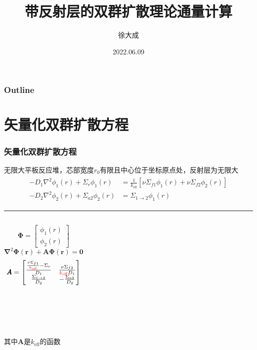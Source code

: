 \documentclass[handout,10pt]{beamer}
\title[Multigroup Diffusion Equations]{带反射层的双群扩散理论通量计算}
\author[Dacheng Xu]{徐大成}
\institute[DEP]{清华大学工程物理系}
\date{2022.06.09}
\begin{document}
\frame{\titlepage}

\begin{frame}[noframenumbering]
\frametitle{Outline}
\thispagestyle{empty}
\tableofcontents
\end{frame}

\section{矢量化双群扩散方程}

\begin{frame}
\frametitle{矢量化双群扩散方程}
无限大平板反应堆，芯部宽度$r_0$有限且中心位于坐标原点处，反射层为无限大
\begin{align*}
    \label{eq:two3_group}
    \begin{split}
        -D_1\nabla^2\phi_1(r) + \Sigma_r\phi_1(r) &= \frac{1}{k_\mathrm{eff}}\left[\nu\Sigma_{f1}\phi_1(r)+\nu\Sigma_{f2}\phi_2(r)\right] \\
        -D_2\nabla^2\phi_2(r) + \Sigma_{a2}\phi_2(r) &= \Sigma_{1\rightarrow 2}\phi_1(r)
    \end{split}
\end{align*}
\noindent\rule{\textwidth}{0.5pt}
\begin{columns}
\begin{equation*}
    \label{eq:vector_phi}
    \pmb{\Phi} = \begin{bmatrix}
        \phi_1(r) \\
        \phi_2(r)
    \end{bmatrix}
\end{equation*}
\begin{equation*}
    \label{eq:A_vector_phi}
    \pmb{\nabla}^2\pmb{\Phi}(\pmb{r})+\pmb{A}\pmb{\Phi}(\pmb{r}) = \pmb{0}
\end{equation*}
\begin{equation*}
    \label{eq:A}
    \pmb{A} = \begin{bmatrix}
        \frac{\frac{\nu\Sigma_{f1}}{\textcolor{red}{k_\mathrm{eff}}}-\Sigma_r}{D_1} & \frac{\nu\Sigma_{f2}}{\textcolor{red}{k_\mathrm{eff}}D_1} \\
        \frac{\Sigma_{1\rightarrow2}}{D_2} & -\frac{\Sigma_{a2}}{D_2}
    \end{bmatrix}
\end{equation*}
\end{columns}
\ 

\ 

其中$\pmb{A}$是$k_\mathrm{eff}$的函数
\end{frame}
\end{document}
